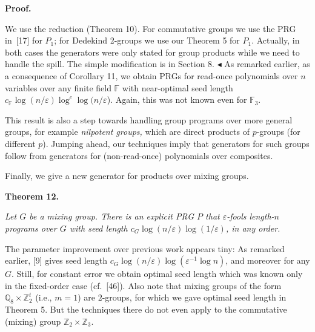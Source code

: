 \documentclass[10pt,a4paper]{article}
\begin{document}
\par\medskip\noindent\textbf{Proof.}\par




We use the reduction (Theorem 10). For commutative groups
we use the PRG in [17] for $P_{1}$; for Dedekind
2-groups we use our Theorem 5 for $P_{1}$. Actually,
in both cases the generators were only stated for group products while
we need to handle the spill. The simple modification is in Section 8.
$\blacktriangleleft$
As remarked earlier, as a consequence of Corollary 11, we obtain
PRGs for read-once polynomials over $n$ variables over any finite field
$\mathbb{F}$ with near-optimal seed length $c_{\mathbb{F}}\log(n/\varepsilon)\log^{c}\log(n/\varepsilon$).
Again, this was not known even for $\mathbb{F}_{3}$.\par




This result is also a step towards handling group programs over more
general groups, for example \emph{nilpotent groups,} which are direct
products of $p$-groups (for different $p$). Jumping ahead, our techniques imply that generators for such groups follow from generators for (non-read-once) polynomials over composites.\par




Finally, we give a new generator for products over mixing groups.\par






\par\medskip\noindent\textbf{
\textbf{Theorem 12}\textbf{.}
}\par



\emph{Let $G$ be a mixing group. There is an explicit PRG $P$ that $\varepsilon$-fools length-$n$ programs
over $G$ with seed length $c_{G}\log(n/\varepsilon)\log(1/\varepsilon)$, in any order.}\par







The parameter improvement over previous work appears tiny: As remarked
earlier, [9] gives seed length
$c_{G}\log(n/\varepsilon)\log(\varepsilon^{-1}\log n)$, and moreover for any $G$.
Still, for constant error we obtain optimal seed length which was
known only in the fixed-order case (cf. [46]).
Also note that mixing groups of the form $\mathbb{Q}_{8}\times\mathbb{Z}_{2}^{t}$
(i.e., $m=1$) are $2$-groups, for which we gave optimal seed length
in Theorem 5. But the techniques there do not even
apply to the commutative (mixing) group $\mathbb{Z}_{2}\times\mathbb{Z}_{3}$.\par
\end{document}
